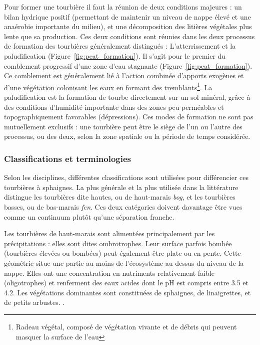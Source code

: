 Pour former une tourbière il faut la réunion de deux conditions majeures : un bilan hydrique positif (permettant de maintenir un niveau de nappe élevé et une anaérobie importante du milieu), et une décomposition des litières végétales plus lente que sa production.
Ces deux conditions sont réunies dans les deux processus de formation des tourbières généralement distingués : L'atterrissement et la paludification (Figure~\ref{fig:peat_formation}).
Il s'agit pour le premier du comblement progressif d'une zone d'eau stagnante (Figure~\ref{fig:peat_formation}).
Ce comblement est généralement lié à l'action combinée d'apports exogènes et d'une végétation colonisant les eaux en formant des tremblants\footnote{Radeau végétal, composé de végétation vivante et de débris qui peuvent masquer la surface de l'eau}.
La paludification est la formation de tourbe directement sur un sol minéral, grâce à des conditions d'humidité importante dans des zones peu perméables et topographiquement favorables (dépressions).
Ces modes de formation ne sont pas mutuellement exclusifs : une tourbière peut être le siège de l'un ou l'autre des processus, ou des deux, selon la zone spatiale ou la période de temps considérée.

\subsubsection{Classifications et terminologies}
%


Selon les disciplines, différentes classifications sont utilisées pour différencier ces tourbières à sphaignes.
La plus générale et la plus utilisée dans la littérature distingue les tourbières dite hautes, ou de haut-marais \textit{bog}, et les tourbières basses, ou de bas-marais \textit{fen}.
Ces deux catégories doivent davantage être vues comme un continuum plutôt qu'une séparation franche.

Les tourbières de haut-marais sont alimentées principalement par les précipitations : elles sont dites ombrotrophes.
Leur surface parfois bombée (tourbières élevées ou bombées) peut également être plate ou en pente.
Cette géométrie situe une partie au moins de l'écosystème au dessus du niveau de la nappe.
Elles ont une concentration en nutriments relativement faible (oligotrophes) et renferment des eaux acides dont le pH est compris entre 3.5 et 4.2.
Les végétations dominantes sont constituées de sphaignes, de linaigrettes, et de petits arbustes.  \citep{francez2000,rydin2013a}.

